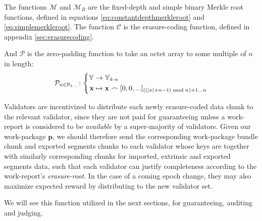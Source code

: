 The functions $\mathcal{M}$ and $\mathcal{M}_B$ are the fixed-depth and simple binary Merkle root functions, defined in equations \ref{eq:constantdepthmerkleroot} and \ref{eq:simplemerkleroot}. The function $\mathcal{C}$ is the erasure-coding function, defined in appendix \ref{sec:erasurecoding}.

And $\mathcal{P}$ is the zero-padding function to take an octet array to some multiple of $n$ in length:
\begin{equation}\label{eq:zeropadding}
  \mathcal{P}_{n \in \N_{1\dots}}\colon\left\{\begin{aligned}
    \Y &\to \Y_{k\cdot n}\\
    \mathbf{x} &\mapsto \mathbf{x} \concat [0, 0, ...]_{((|x|+n - 1) \bmod n) + 1 \dots n}
  \end{aligned}\right.
\end{equation}

Validators are incentivized to distribute each newly erasure-coded data chunk to the relevant validator, since they are not paid for guaranteeing unless a work-report is considered to be \emph{available} by a super-majority of validators. Given our work-package $\mathbf{p}$, we should therefore send the corresponding work-package bundle chunk and exported segments chunks to each validator whose keys are together with similarly corresponding chunks for imported, extrinsic and exported segments data, such that each validator can justify completeness according to the work-report's \emph{erasure-root}. In the case of a coming epoch change, they may also maximize expected reward by distributing to the new validator set.

We will see this function utilized in the next sections, for guaranteeing, auditing and judging.

\undef{\newavailabilityspecifier}
\undef{\itemtoresult}
\undef{\countupexports}
\undef{\importsegmentdata}
\undef{\pagedproofs}
\undef{\marshallrefine}
\undef{\extrinsicdata}
